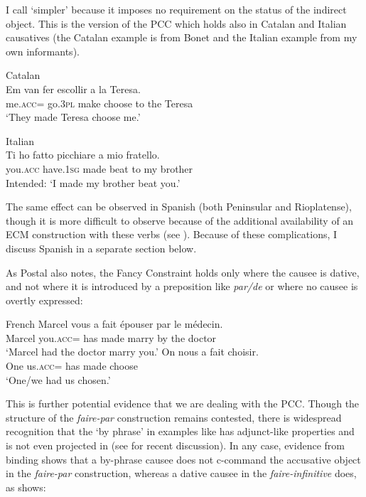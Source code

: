 \documentclass[output=paper,colorlinks,citecolor=brown,nonflat]{./langscibook}
\begin{document}
I call  ‘simpler’ because it imposes no requirement on the status of the indirect object. This is the version of the PCC which holds also in Catalan and Italian causatives (the Catalan example is from Bonet and the Italian example from my own informants). 

\ea%
    \label{ex:sheehan:17}
    Catalan \citep[195]{Bonet1991}\\
    \gll   *Em       van     fer     escollir   a   la   Teresa.\\
            me.\textsc{acc}=  go.\textsc{3pl}   make   choose   to   the   Teresa\\
    \glt ‘They made Teresa choose me.’
\z

\ea%
    \label{ex:sheehan:18}
    Italian\\
    \gll   *Ti     ho     fatto   picchiare     a   mio   fratello.\\
         you.\textsc{acc}  have.\textsc{1sg}   made beat         to   my   brother\\
    \glt    Intended: ‘I made my brother beat you.’
\z

The same effect can be observed in Spanish (both Peninsular and Rioplatense), though it is more difficult to observe because of the additional availability of an ECM construction with these verbs (see \citealt{Strozer1976, Torrego2010}). Because of these complications, I discuss Spanish in a separate section below.  

As Postal also notes, the Fancy Constraint holds only where the causee is dative, and not where it is introduced by a preposition like \textit{par/de} or where no causee is overtly expressed:

\ea%
    \label{ex:sheehan:19}
    French \citep[3]{Postal1989}
    \ea\label{ex:sheehan:19a}
    \gll    Marcel vous     a  fait   épouser   par   le   médecin.\\
            Marcel you.\textsc{acc}=  has  made   marry   by   the   doctor\\
    \glt ‘Marcel had the doctor marry you.’
    \ex\label{ex:sheehan:19b}
    \gll   On  nous     a   fait choisir.\\
            One   us.\textsc{acc}=  has   made choose\\
    \glt    ‘One/we had us chosen.’
    \z
\z

This is further potential evidence that we are dealing with the PCC. Though the structure of the \textit{faire-par} construction remains contested, there is widespread recognition that the ‘by phrase’ in examples like  has adjunct-like properties and is not even projected in  (see \citealt{Guasti1996, FolliHarley2007, SheehanCyrino2016} for recent discussion). In any case, evidence from binding shows that a by-phrase causee does not c-command the accusative object in the \textit{faire-par} construction, whereas a dative causee in the \textit{faire-infinitive} does, as \citet{Burzio1986} shows:
\end{document}

